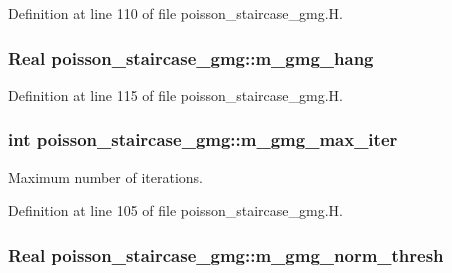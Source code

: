 Definition at line 110 of file poisson\+\_\+staircase\+\_\+gmg.\+H.

\subsubsection[{\texorpdfstring{m\+\_\+gmg\+\_\+hang}{m_gmg_hang}}]{\setlength{\rightskip}{0pt plus 5cm}Real poisson\+\_\+staircase\+\_\+gmg\+::m\+\_\+gmg\+\_\+hang\hspace{0.3cm}{\ttfamily [protected]}}\hypertarget{classpoisson__staircase__gmg_aa02bed6a84cff8c4de9f5d957b7973ef}{}\label{classpoisson__staircase__gmg_aa02bed6a84cff8c4de9f5d957b7973ef}


Definition at line 115 of file poisson\+\_\+staircase\+\_\+gmg.\+H.

\subsubsection[{\texorpdfstring{m\+\_\+gmg\+\_\+max\+\_\+iter}{m_gmg_max_iter}}]{\setlength{\rightskip}{0pt plus 5cm}int poisson\+\_\+staircase\+\_\+gmg\+::m\+\_\+gmg\+\_\+max\+\_\+iter\hspace{0.3cm}{\ttfamily [protected]}}\hypertarget{classpoisson__staircase__gmg_afedb31be654bbc19fa7c3777cf840b5d}{}\label{classpoisson__staircase__gmg_afedb31be654bbc19fa7c3777cf840b5d}


Maximum number of iterations. 



Definition at line 105 of file poisson\+\_\+staircase\+\_\+gmg.\+H.

\subsubsection[{\texorpdfstring{m\+\_\+gmg\+\_\+norm\+\_\+thresh}{m_gmg_norm_thresh}}]{\setlength{\rightskip}{0pt plus 5cm}Real poisson\+\_\+staircase\+\_\+gmg\+::m\+\_\+gmg\+\_\+norm\+\_\+thresh\hspace{0.3cm}{\ttfamily [protected]}}\hypertarget{classpoisson__staircase__gmg_a11491c446a1b7d03132a1235e159c273}{}\label{classpoisson__staircase__gmg_a11491c446a1b7d03132a1235e159c273}


